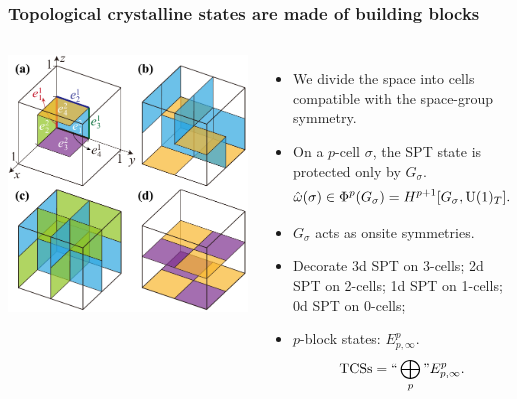 \documentclass[xcolor=table, aspectratio=169,ignorenonframetext]{beamer}
\newcommand{\uone}{\text U(1)}
\begin{document}
\begin{frame}
	\frametitle{Topological crystalline states are made of building blocks}
	\begin{columns}
		\begin{center}
			\includegraphics[width=\textwidth]{../spspt/blocks}
		\end{center}
		\begin{itemize}
			\item We divide the space into cells compatible with the space-group symmetry.
			\item On a $p$-cell $\sigma$, the SPT state is protected only by $G_\sigma$.
			\[\hat\omega(\sigma)\in \Phi^p(G_\sigma) = H^{p+1}[G_\sigma,\uone_T].\]
			\item $G_\sigma$ acts as onsite symmetries.
			\item Decorate 3d SPT on 3-cells; 2d SPT on 2-cells; 1d SPT on 1-cells; 0d SPT on 0-cells;
			\item $p$-block states: $E^p_{p,\infty}$.
			\[\text{TCSs} = ``\bigoplus_p\text{''} E^p_{p,\infty}.\]
		\end{itemize}
	\end{columns}
\end{frame}
\end{document}

